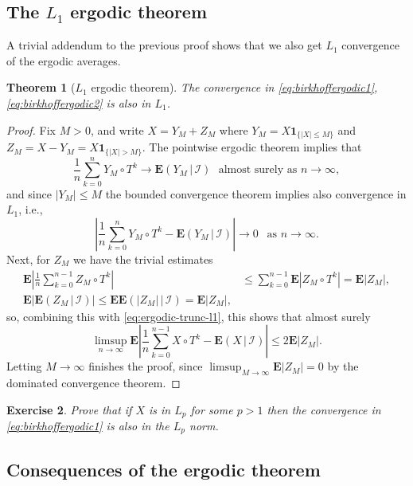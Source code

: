 \documentclass[12pt]{article}
\newtheorem{thm}{Theorem}[section]
\newtheorem{exercise}[thm]{Exercise}
\newcommand{\expec}{\mathbf{E}}
\newcommand{\condexp}[2]{\expec\left(#1\,|\,#2\right)}
\newcommand{\ind}{\textbf{1}}
\theoremstyle{example}
\begin{document}
\subsection{The $L_1$ ergodic theorem}

A trivial addendum to the previous proof shows that we also get $L_1$ convergence of the ergodic averages.

\begin{thm}[$L_1$ ergodic theorem] The convergence in \eqref{eq:birkhoffergodic1}, \eqref{eq:birkhoffergodic2} is also in $L_1$.
\end{thm}

\begin{proof}
Fix $M>0$, and write $X=Y_M + Z_M$ where $Y_M = X \ind_{\{|X|\le M\}}$ and $Z_M = X-Y_M = X \ind_{\{|X|>M\}}$. The pointwise ergodic theorem implies that
$$ \frac{1}{n} \sum_{k=0}^n Y_M \circ T^k \to \condexp{Y_M}{\mathcal{I}}
\ \ \ \textrm{almost surely as }n\to\infty, $$
and since $|Y_M|\le M$ the bounded convergence theorem implies also convergence in $L_1$, i.e.,
\begin{equation} \label{eq:ergodic-trunc-l1}
\left|\frac{1}{n} \sum_{k=0}^n Y_M \circ T^k - \condexp{Y_M}{\mathcal{I}}\right| \to 0 \ \ \textrm{ as }n\to\infty.
\end{equation}
Next, for $Z_M$ we have the trivial estimates
\begin{align*}
\expec \left| \frac{1}{n} \sum_{k=0}^{n-1} Z_M \circ T^k \right|
& \le \sum_{k=0}^{n-1} \expec|Z_M \circ T^k| = \expec|Z_M|, \\
\expec \left| \condexp{Z_M}{\mathcal{I}} \right| \le \expec \condexp{|Z_M|}{\mathcal{I}} = \expec|Z_M|,
\end{align*}
so, combining this with \eqref{eq:ergodic-trunc-l1}, this shows that almost surely
$$ \limsup_{n\to\infty} \expec\left| \frac{1}{n} \sum_{k=0}^{n-1} X\circ T^k - \condexp{X}{\mathcal{I}}\right|
\le 2 \expec|Z_M|. $$
Letting $M\to\infty$ finishes the proof, since $\limsup_{M\to\infty} \expec|Z_M| = 0$ by the dominated convergence theorem.
\end{proof}

\begin{exercise} Prove that if $X$ is in $L_p$ for some $p>1$ then the convergence in \eqref{eq:birkhoffergodic1}  is also in the $L_p$ norm.
\end{exercise}

\subsection{Consequences of the ergodic theorem}
\end{document}
